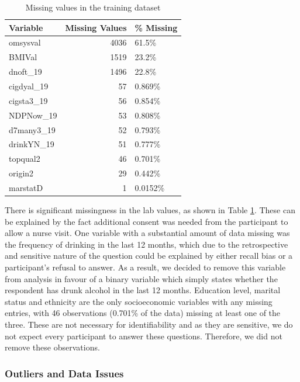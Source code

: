 \documentclass[
  11pt,
  twocolumn]{article}
\begin{document}
\begin{table}
\centering
\caption{\label{tab:outputnatable}Missing values in the training dataset\label{tab:output-na-table}}
\centering
\fontsize{9}{11}\selectfont
\begin{tabular}[t]{l|r|l}
\hline
\textbf{Variable} & \textbf{Missing Values} & \textbf{\% Missing}\\
\hline
omsysval & 4036 & 61.5\%\\
\hline
BMIVal & 1519 & 23.2\%\\
\hline
dnoft\_19 & 1496 & 22.8\%\\
\hline
cigdyal\_19 & 57 & 0.869\%\\
\hline
cigsta3\_19 & 56 & 0.854\%\\
\hline
NDPNow\_19 & 53 & 0.808\%\\
\hline
d7many3\_19 & 52 & 0.793\%\\
\hline
drinkYN\_19 & 51 & 0.777\%\\
\hline
topqual2 & 46 & 0.701\%\\
\hline
origin2 & 29 & 0.442\%\\
\hline
marstatD & 1 & 0.0152\%\\
\hline
\end{tabular}
\end{table}

There is significant missingness in the lab values, as shown in Table
\ref{tab:output-na-table}. These can be explained by the fact additional
consent was needed from the participant to allow a nurse visit. One
variable with a substantial amount of data missing was the frequency of
drinking in the last 12 months, which due to the retrospective and
sensitive nature of the question could be explained by either recall
bias or a participant's refusal to answer. As a result, we decided to
remove this variable from analysis in favour of a binary variable which
simply states whether the respondent has drunk alcohol in the last 12
months. Education level, marital status and ethnicity are the only
socioeconomic variables with any missing entries, with 46 observations
(0.701\% of the data) missing at least one of the three. These are not
necessary for identifiability and as they are sensitive, we do not
expect every participant to answer these questions. Therefore, we did
not remove these observations.

\subsubsection{Outliers and Data Issues}\label{outliers-and-data-issues}
\end{document}
